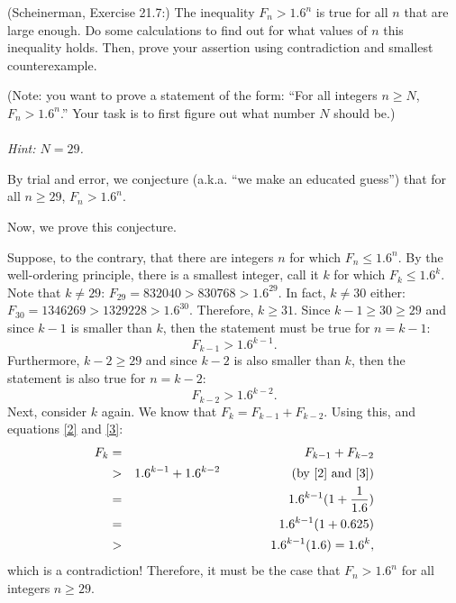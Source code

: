 \documentclass{article}
\theoremstyle{definition}
\begin{document}
\begin{question}
    (Scheinerman, Exercise 21.7:) 
    The inequality $F_n > 1.6^n$ is true for all $n$ that are large enough.  Do some calculations to find out for what values of $n$ this inequality holds.  Then, prove your assertion using contradiction and smallest counterexample.

    (Note: you want to prove a statement of the form: ``For all integers $n \geq N$, $F_n > 1.6^n$.''  Your task is to first figure out what number $N$ should be.)\\~\\
    \textit{Hint: $N=29$.}
\end{question}
\begin{solution}
By trial and error, we conjecture (a.k.a. ``we make an educated guess'') that for all $n \geq 29$, $F_n > 1.6^n$.

Now, we prove this conjecture.

Suppose, to the contrary, that there are integers $n$ for which $F_n \leq 1.6^n$. By the well-ordering principle, there is a smallest integer, call it $k$ for which $F_k \leq 1.6^k$. Note that $k \neq 29$: $F_{29} = 832040 > 830768 > 1.6^{29}$.  In fact, $k \neq 30$ either: $F_{30} = 1346269 > 1329228 > 1.6^{30}$. Therefore, $k \geq 31$. Since $k-1 \geq 30 \geq 29$ and since $k-1$ is smaller than $k$, then the statement must be true for $n = k-1$:
\begin{equation} F_{k-1} > 1.6^{k-1}. \label{2}\end{equation}
Furthermore, $k-2 \geq 29$ and since $k-2$ is also smaller than $k$, then the statement is also true for $n = k-2$:
\begin{equation} F_{k-2} > 1.6^{k-2}. \label{3} \end{equation}
 Next, consider $k$ again.  We know that $F_{k} = F_{k-1} + F_{k-2}$.  Using this, and equations \eqref{2} and \eqref{3}:
\begin{eqnarray*}
F_k & = & F_{k-1} + F_{k-2} \\
	& > & 1.6^{k-1} + 1.6^{k-2} \hspace{2cm} (\text{by \eqref{2} and \eqref{3}})\\
	& = & 1.6^{k-1} (1 + \frac{1}{1.6}) \\
	& = & 1.6^{k-1} (1 + 0.625) \\
	& > & 1.6^{k-1} (1.6) = 1.6^{k},
\end{eqnarray*}
which is a contradiction!
Therefore, it must be the case that $F_n > 1.6^n$ for all integers $n \geq 29$.
\end{solution}
\end{document}
